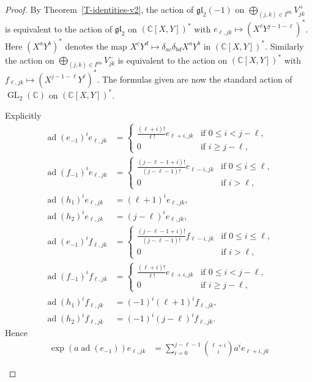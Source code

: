 \documentclass[11pt,letterpaper]{amsart}
\numberwithin{thecounter}{section}
\theoremstyle{definition}
\DeclareMathOperator{\GL}{GL}
\DeclareMathOperator{\ad}{ad}
\DeclareMathOperator{\im}{{im}}
\newcommand{\C}{{\mathbb C}}
\begin{document}
\begin{proof} 
By Theorem~\ref{T-identities-v2}, the action of $\mathfrak{gl}_2(-1)$ on $\bigoplus_{(j,k)\in I^{\im}} V^+_{jk}$ is equivalent to the action of $\mathfrak{gl}_2$ on $\left(\C[X,Y] \right)^*$ with
$e_{\ell,jk}\mapsto \left(X^\ell Y^{j-1-\ell} \right)^*$. Here $\left(X^a Y^b \right)^*$ denotes the map $X^cY^d\mapsto \delta_{ac}\delta_{bd}X^a Y^b$ in $\left(\C[X,Y] \right)^*$. Similarly the action on $\bigoplus_{(j,k)\in I^{\im}} V^-_{jk}$ is equivalent to the action on $\left(\C[X,Y] \right)^*$ with
$f_{\ell,jk}\mapsto \left(X^{j-1-\ell}Y^\ell \right)^*$.
The formulas given are now the standard action of $\GL_2(\C)$ on $\left(\C[X,Y] \right)^*$.
\begin{longver}
Explicitly
\begin{align*}
\ad(e_{-1})^i e_{\ell,jk} &= \begin{cases} \frac{(\ell+i)!}{\ell!} %
  e_{\ell+i,jk}&\text{if $0\le i< j-\ell$,}\\ 0&\text{if $i\ge j-\ell$,}\end{cases} \\
\ad(f_{-1})^i e_{\ell,jk} &= \begin{cases}  \frac{(j-\ell-1+i)!}{(j-\ell-1)!} e_{\ell-i,jk}&\text{if $0\le i\le \ell$,}\\ 0&\text{if $i> \ell$,}\end{cases} \\
\ad(h_1)^i e_{\ell,jk}&= (\ell+1)^i e_{\ell,jk},\\
\ad(h_2)^i e_{\ell,jk}&= (j-\ell)^i e_{\ell,jk},\\
\ad(e_{-1})^i f_{\ell,jk} &= \begin{cases} \frac{(j-\ell-1+i)!}{(j-\ell-1)!} %
  f_{\ell-i,jk}&\text{if $0\le i\le \ell$,}\\ 0&\text{if $i >\ell$,}\end{cases} \\
\ad(f_{-1})^i f_{\ell,jk} &= \begin{cases}  \frac{(\ell+i)!}{\ell!} e_{\ell+i,jk}&\text{if $0\le i< j-\ell$,}\\ 0&\text{if $i\ge j-\ell$,}\end{cases} \\
\ad(h_1)^i f_{\ell,jk}&= (-1)^i(\ell+1)^i f_{\ell,jk},\\
\ad(h_2)^i f_{\ell,jk}&= (-1)^i(j-\ell)^i f_{\ell,jk}.
\end{align*}
Hence
\begin{align*}
\exp(a\ad(e_{-1})) e_{\ell,jk} &=\sum_{i=0}^{j-\ell-1} \binom{\ell+i}{i} a^{i}e_{\ell+i,jk}

\end{align*}
\end{longver}
\end{proof}
\end{document}
